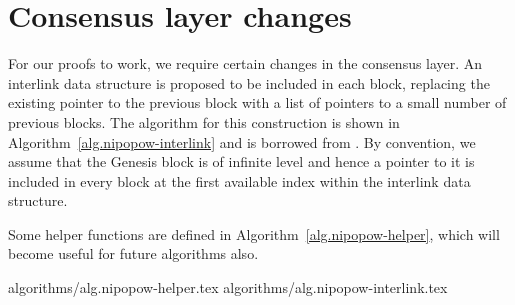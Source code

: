 \section{Consensus layer changes}

For our proofs to work, we require certain changes in the consensus layer.
An interlink data structure is proposed to be included in each block, replacing
the existing pointer to the previous block with a list of pointers to a small
number of previous blocks. The algorithm for this construction is shown in
Algorithm~\ref{alg.nipopow-interlink} and is borrowed from \cite{KLS}. By
convention, we assume that the Genesis block is of infinite level and hence a
pointer to it is included in every block at the first available index within
the interlink data structure.

Some helper functions are defined in Algorithm~\ref{alg.nipopow-helper}, which
will become useful for future algorithms also.

{algorithms/alg.nipopow-helper.tex}
{algorithms/alg.nipopow-interlink.tex}
